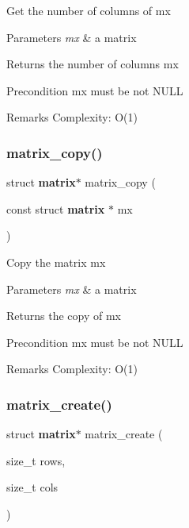 Get the number of columns of {\ttfamily mx}


\begin{DoxyParams}{Parameters}
{\em mx} & a matrix \\
\hline
\end{DoxyParams}
\begin{DoxyReturn}{Returns}
the number of columns {\ttfamily mx}
\end{DoxyReturn}
\begin{DoxyPrecond}{Precondition}
{\ttfamily mx} must be not N\+U\+LL
\end{DoxyPrecond}
\begin{DoxyRemark}{Remarks}
Complexity\+: O(1) 
\end{DoxyRemark}
\mbox{\label{matrix_8c_a6663b065febb290385857b26fdb1a353}} 
\subsubsection{matrix\+\_\+copy()}
{\footnotesize\ttfamily struct \textbf{ matrix}$\ast$ matrix\+\_\+copy (\begin{DoxyParamCaption}\item[{const struct \textbf{ matrix} $\ast$}]{mx }\end{DoxyParamCaption})}

Copy the matrix {\ttfamily mx}


\begin{DoxyParams}{Parameters}
{\em mx} & a matrix \\
\hline
\end{DoxyParams}
\begin{DoxyReturn}{Returns}
the copy of {\ttfamily mx}
\end{DoxyReturn}
\begin{DoxyPrecond}{Precondition}
{\ttfamily mx} must be not N\+U\+LL
\end{DoxyPrecond}
\begin{DoxyRemark}{Remarks}
Complexity\+: O(1) 
\end{DoxyRemark}
\mbox{\label{matrix_8c_ad2d40d9c13eba774d6bb788021242a95}} 
\subsubsection{matrix\+\_\+create()}
{\footnotesize\ttfamily struct \textbf{ matrix}$\ast$ matrix\+\_\+create (\begin{DoxyParamCaption}\item[{size\+\_\+t}]{rows,  }\item[{size\+\_\+t}]{cols }\end{DoxyParamCaption})}

